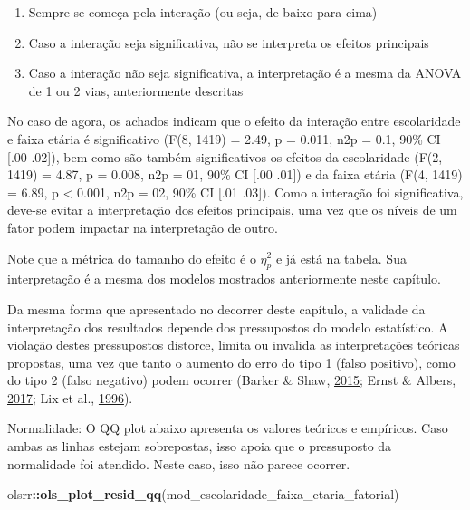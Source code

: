 \documentclass[
]{book}
\newenvironment{Shaded}{\begin{snugshade}}{\end{snugshade}}
\newcommand{\KeywordTok}[1]{\textcolor[rgb]{0.13,0.29,0.53}{\textbf{#1}}}
\newcommand{\NormalTok}[1]{#1}
\newcommand{\OperatorTok}[1]{\textcolor[rgb]{0.81,0.36,0.00}{\textbf{#1}}}
\providecommand{\tightlist}{%
  \setlength{\itemsep}{0pt}\setlength{\parskip}{0pt}}
\begin{document}
\begin{enumerate}
\def\labelenumi{\arabic{enumi}.}
\tightlist
\item
  Sempre se começa pela interação (ou seja, de baixo para cima)\\
\item
  Caso a interação seja significativa, não se interpreta os efeitos
  principais\\
\item
  Caso a interação não seja significativa, a interpretação é a mesma da
  ANOVA de 1 ou 2 vias, anteriormente descritas
\end{enumerate}

No caso de agora, os achados indicam que o efeito da interação entre
escolaridade e faixa etária é significativo (F(8, 1419) = 2.49, p =
0.011, n2p = 0.1, 90\% CI {[}.00 .02{]}), bem como são também
significativos os efeitos da escolaridade (F(2, 1419) = 4.87, p = 0.008,
n2p = 01, 90\% CI {[}.00 .01{]}) e da faixa etária (F(4, 1419) = 6.89, p
\textless{} 0.001, n2p = 02, 90\% CI {[}.01 .03{]}). Como a interação
foi significativa, deve-se evitar a interpretação dos efeitos
principais, uma vez que os níveis de um fator podem impactar na
interpretação de outro.

Note que a métrica do tamanho do efeito é o \(\eta_p^2\) e já está na
tabela. Sua interpretação é a mesma dos modelos mostrados anteriormente
neste capítulo.

Da mesma forma que apresentado no decorrer deste capítulo, a validade da
interpretação dos resultados depende dos pressupostos do modelo
estatístico. A violação destes pressupostos distorce, limita ou invalida
as interpretações teóricas propostas, uma vez que tanto o aumento do
erro do tipo 1 (falso positivo), como do tipo 2 (falso negativo) podem
ocorrer (Barker \& Shaw, \protect\hyperlink{ref-Barker2015}{2015}; Ernst
\& Albers, \protect\hyperlink{ref-Ernst2017}{2017}; Lix et al.,
\protect\hyperlink{ref-Lix1996}{1996}).

Normalidade: O QQ plot abaixo apresenta os valores teóricos e empíricos.
Caso ambas as linhas estejam sobrepostas, isso apoia que o pressuposto
da normalidade foi atendido. Neste caso, isso não parece ocorrer.

\begin{Shaded}
\begin{Highlighting}[]
\NormalTok{olsrr}\OperatorTok{::}\KeywordTok{ols_plot_resid_qq}\NormalTok{(mod_escolaridade_faixa_etaria_fatorial)}
\end{Highlighting}
\end{Shaded}
\end{document}
